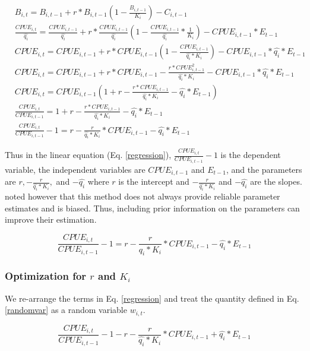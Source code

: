 \documentclass[oneside,12pt,final]{sty/ucthesis-CA2012}
\begin{document}
\begin{mainmatter}
\begin{align*}
& B_{i,t} = B_{i,t-1} + r*B_{i,t-1} \left(1- \frac{B_{i,t-1}}{K_i} \right)-C_{i,t-1} \\
 &\frac{CPUE_{i,t}}{\widehat{q_i}} = \frac{CPUE_{i,t-1}}{\widehat{q_i}}  + r*\frac{CPUE_{i,t-1}}{\widehat{q_i}} \left(1-\frac{CPUE_{i,t-1}}{\widehat{q_i}}*\frac{1}{K_i} \right) - CPUE_{i,t-1}*E_{t-1} \\
&CPUE_{i,t} = CPUE_{i,t-1} + r*CPUE_{i,t-1} \left(1-\frac{CPUE_{i,t-1}}{\widehat{q_i}*K_i} \right) - CPUE_{i,t-1}*\widehat{q_i}*E_{t-1} \\
&CPUE_{i,t} = CPUE_{i,t-1} + r*CPUE_{i,t-1} -\frac{r*CPUE_{i,t-1}^2}{\widehat{q_i}*K_i}  - CPUE_{i,t-1}*\widehat{q_i}*E_{t-1} \\
&CPUE_{i,t} = CPUE_{i,t-1} \left(1 + r -\frac{r*CPUE_{i,t-1}}{\widehat{q_i}*K_i}  - \widehat{q_i}*E_{t-1} \right) \\
&\frac{CPUE_{i,t}}{CPUE_{i,t-1} } = 1 + r -\frac{r*CPUE_{i,t-1}}{\widehat{q_i}*K_i}  - \widehat{q_i}*E_{t-1} \\
&\frac{CPUE_{i,t}}{CPUE_{i,t-1} } -1 = r -\frac{r}{\widehat{q_i}*K_i}*CPUE_{i,t-1}  - \widehat{q_i}*E_{t-1} 
\end{align*}

Thus in the linear equation (Eq. \ref{regression}), $\frac{CPUE_{i,t}}{CPUE_{i,t-1} } -1$ is the dependent variable, the independent variables are $CPUE_{i,t-1} $ and $E_{t-1} $, and the parameters are $r, -\frac{r}{\widehat{q_i}*K_i},$ and $-\widehat{q_i}$ where $r$ is the intercept and $-\frac{r}{\widehat{q_i}*K_i}$ and $-\widehat{q_i}$ are the slopes. \citet{hilborn1992quantitative} noted however that this method does not always provide reliable parameter estimates and is biased. Thus, including prior information on the parameters can improve their estimation.

\begin{equation} \label{regression}
\frac{CPUE_{i,t}}{CPUE_{i,t-1} } -1 = r -\frac{r}{\widehat{q_i}*K_i}*CPUE_{i,t-1}  - \widehat{q_i}*E_{t-1} 
\end{equation}

\subsubsection{Optimization for $r$ and $K_i$ } 
We re-arrange the terms in Eq. \ref{regression} and treat the quantity defined in Eq. \ref{randomvar} as a random variable $w_{i,t}$. 

\begin{equation} \label{randomvar}
\frac{CPUE_{i,t}}{CPUE_{i,t-1} } -1 - r -\frac{r}{\widehat{q_i}*K_i}*CPUE_{i,t-1}  + \widehat{q_i}*E_{t-1} 
\end{equation}


\end{mainmatter}
\end{document}
